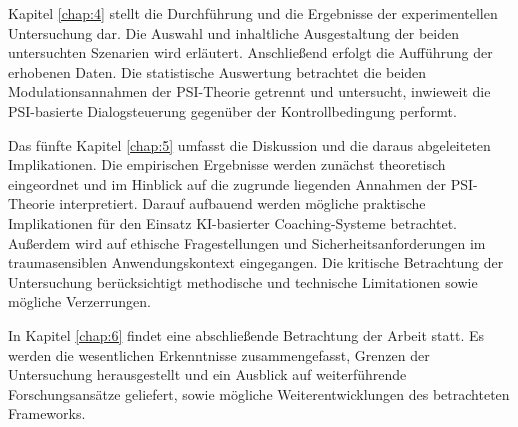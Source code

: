 Kapitel \ref{chap:4} stellt die Durchführung und die Ergebnisse der experimentellen Untersuchung dar. Die Auswahl und inhaltliche Ausgestaltung der beiden untersuchten Szenarien wird erläutert. Anschließend erfolgt die Aufführung der erhobenen Daten. Die statistische Auswertung betrachtet die beiden Modulationsannahmen der PSI-Theorie getrennt und untersucht, inwieweit die PSI-basierte Dialogsteuerung gegenüber der Kontrollbedingung performt.

Das fünfte Kapitel \ref{chap:5} umfasst die Diskussion und die daraus abgeleiteten Implikationen. Die empirischen Ergebnisse werden zunächst theoretisch eingeordnet und im Hinblick auf die zugrunde liegenden Annahmen der PSI-Theorie interpretiert. Darauf aufbauend werden mögliche praktische Implikationen für den Einsatz KI-basierter Coaching-Systeme betrachtet. Außerdem wird auf ethische Fragestellungen und Sicherheitsanforderungen im traumasensiblen Anwendungskontext eingegangen. Die kritische Betrachtung der Untersuchung berücksichtigt methodische und technische Limitationen sowie mögliche Verzerrungen.

In Kapitel \ref{chap:6} findet eine abschließende Betrachtung der Arbeit statt. Es werden die wesentlichen Erkenntnisse zusammengefasst, Grenzen der Untersuchung  herausgestellt und ein Ausblick auf weiterführende Forschungsansätze geliefert, sowie mögliche Weiterentwicklungen des betrachteten Frameworks.


